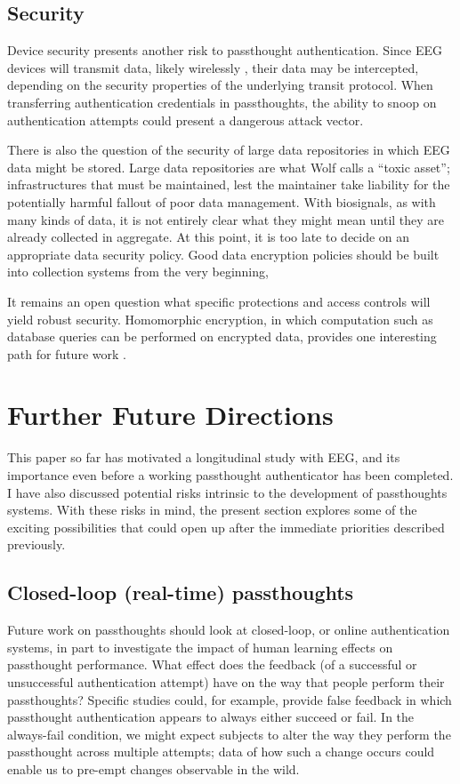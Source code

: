 \documentclass[sigconf]{acmart}
\begin{document}
\subsection{Security}
\label{sec:orgf04f8ff}
Device security presents another risk to passthought authentication.
Since EEG devices will transmit data, likely wirelessly \cite{Mihajlovic2015}, their data may be intercepted, depending on the security properties of the underlying transit protocol. 
When transferring authentication credentials in passthoughts, the ability to snoop on authentication attempts could present a dangerous attack vector.

There is also the question of the security of large data repositories in which EEG data might be stored.
Large data repositories are what Wolf \cite{Wolf2010} calls a ``toxic asset''; infrastructures that must be maintained, lest the maintainer take liability for the potentially harmful fallout of poor data management.
With biosignals, as with many kinds of data, it is not entirely clear what they might mean until they are already collected in aggregate. 
At this point, it is too late to decide on an appropriate data security policy.
Good data encryption policies should be built into collection systems from the very beginning, 

It remains an open question what specific protections and access controls will yield robust security.
Homomorphic encryption, in which computation such as database queries can be performed on encrypted data, provides one interesting path for future work \cite{Tu2013}.

\section{Further Future Directions}
\label{sec:org8adb539}

This paper so far has motivated a longitudinal study with EEG, and its importance even before a working passthought authenticator has been completed. 
I have also discussed potential risks intrinsic to the development of passthoughts systems.
With these risks in mind, the present section explores some of the exciting possibilities that could open up after the immediate priorities described previously.

\subsection{Closed-loop (real-time) passthoughts}
\label{sec:orgedc89f4}
Future work on passthoughts should look at closed-loop, or online authentication systems,
in part to investigate the impact of human learning effects on passthought performance.
What effect does the feedback (of a successful or unsuccessful authentication attempt) have on the way that people perform their passthoughts?
Specific studies could, for example, provide false feedback in which passthought authentication appears to always either succeed or fail. In the always-fail condition, we might expect subjects to alter the way they perform the passthought across multiple attempts; data of how such a change occurs could enable us to pre-empt changes observable in the wild.
\end{document}
